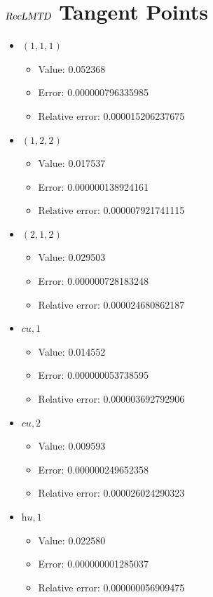 \documentclass{article}%
\begin{document}
\section{$\textsl{RecLMTD}$ Tangent Points}%
\thispagestyle{plain}%
\begin{itemize}%
	\item $(1, 1, 1)$%
	\begin{itemize}%
		\item Value: 0.052368%
		\item Error: 0.000000796335985%
		\item Relative error: 0.000015206237675%
	\end{itemize}%
	\item $(1, 2, 2)$%
	\begin{itemize}%
		\item Value: 0.017537%
		\item Error: 0.000000138924161%
		\item Relative error: 0.000007921741115%
	\end{itemize}%
	\item $(2, 1, 2)$%
	\begin{itemize}%
		\item Value: 0.029503%
		\item Error: 0.000000728183248%
		\item Relative error: 0.000024680862187%
	\end{itemize}%
	\item $\textit{cu},1$%
	\begin{itemize}%
		\item Value: 0.014552%
		\item Error: 0.000000053738595%
		\item Relative error: 0.000003692792906%
	\end{itemize}%
	\item $\textit{cu},2$%
	\begin{itemize}%
		\item Value: 0.009593%
		\item Error: 0.000000249652358%
		\item Relative error: 0.000026024290323%
	\end{itemize}%
	\item $\textit{hu},1$%
	\begin{itemize}%
		\item Value: 0.022580%
		\item Error: 0.000000001285037%
		\item Relative error: 0.000000056909475%
	\end{itemize}%
\end{itemize}%
\end{document}
